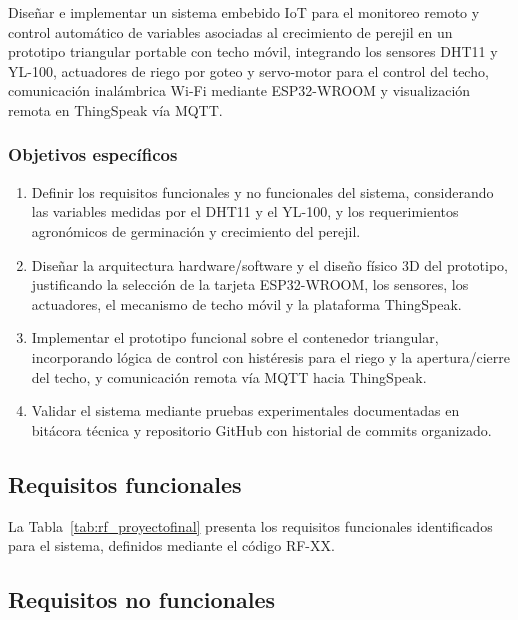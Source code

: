 Diseñar e implementar un sistema embebido IoT para el monitoreo remoto y control automático de variables asociadas al crecimiento de perejil en un prototipo triangular portable con techo móvil, integrando los sensores DHT11 y YL-100, actuadores de riego por goteo y servo-motor para el control del techo, comunicación inalámbrica Wi-Fi mediante ESP32-WROOM y visualización remota en ThingSpeak vía MQTT.

\subsubsection{Objetivos específicos}

\begin{enumerate}
    \item Definir los requisitos funcionales y no funcionales del sistema, considerando las variables medidas por el DHT11 y el YL-100, y los requerimientos agronómicos de germinación y crecimiento del perejil.

    \item Diseñar la arquitectura hardware/software y el diseño físico 3D del prototipo, justificando la selección de la tarjeta ESP32-WROOM, los sensores, los actuadores, el mecanismo de techo móvil y la plataforma ThingSpeak.

    \item Implementar el prototipo funcional sobre el contenedor triangular, incorporando lógica de control con histéresis para el riego y la apertura/cierre del techo, y comunicación remota vía MQTT hacia ThingSpeak.

    \item Validar el sistema mediante pruebas experimentales documentadas en bitácora técnica y repositorio GitHub con historial de commits organizado.
\end{enumerate}

\subsection{Requisitos funcionales}

La Tabla~\ref{tab:rf_proyectofinal} presenta los requisitos funcionales identificados para el sistema, definidos mediante el código RF-XX.



\subsection{Requisitos no funcionales}

